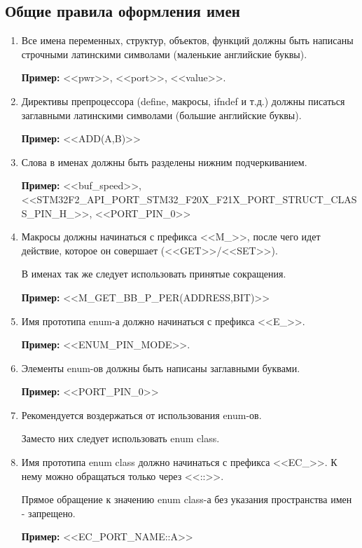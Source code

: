 \subsection{Общие правила оформления имен}
\label{general:rules:0}
\begin{enumerate}
	\item Все имена переменных, структур, объектов, функций должны быть написаны строчными латинскими символами (маленькие английские буквы).
	
	\textbf{Пример: }<<pwr>>, <<port>>, <<value>>.
	\item Директивы препроцессора (define, макросы, ifndef и т.д.) должны писаться заглавными латинскими символами (большие английские буквы). 
	
	\textbf{Пример: }<<ADD(A,B)>>
	\item Слова в именах должны быть разделены нижним подчеркиванием.
	
	\textbf{Пример: }<<buf\_speed>>, <<STM32F2\_\-API\_\-PORT\_\-STM32\_\-F20X\_\-F21X\_\-PORT\_\-STRUCT\_\-CLASS\_\-PIN\_\-H\_>>, <<PORT\_PIN\_0>>
	\item Макросы должны начинаться с префикса <<M\_>>, после чего идет действие, которое он совершает (<<GET>>/<<SET>>).
	
	В именах так же следует использовать принятые сокращения.
	
	\textbf{Пример: }<<M\_GET\_BB\_P\_PER(ADDRESS,BIT)>>
	\item Имя прототипа enum-а должно начинаться с префикса <<E\_>>.
	
	\textbf{Пример: }<<ENUM\_PIN\_MODE>>.
	\item Элементы enum-ов должны быть написаны заглавными буквами.
	
	\textbf{Пример: }<<PORT\_PIN\_0>>
	\item Рекомендуется воздержаться от использования enum-ов.
	
	Заместо них следует использовать enum class.
	\item Имя прототипа enum class должно начинаться с префикса <<EC\_>>. К нему можно обращаться только через <<::>>.
	
	Прямое обращение к значению enum class-а без указания пространства имен - запрещено.
	
	\textbf{Пример: }<<EC\_PORT\_NAME::A>>
\end{enumerate}

